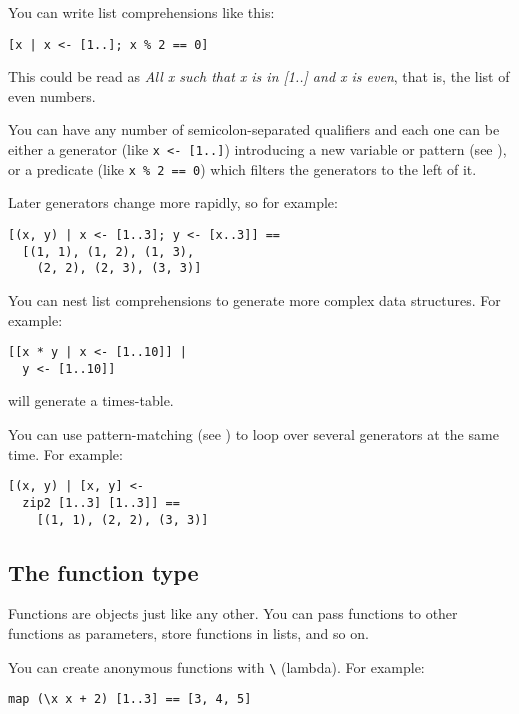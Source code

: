 You can write list comprehensions like this:

\begin{verbatim}
[x | x <- [1..]; x % 2 == 0]
\end{verbatim}

\noindent
This could be read as \emph{All x such that x is in [1..] and x is
even}, that is, the list of even numbers.

You can have any number of semicolon-separated qualifiers and each one can be
either a generator (like \verb"x <- [1..]") introducing a new variable or
pattern (see ),
or a predicate (like \verb"x % 2 == 0") which filters the generators to the
left of it. 

Later generators change more rapidly, so for example:

\begin{verbatim}
[(x, y) | x <- [1..3]; y <- [x..3]] ==
  [(1, 1), (1, 2), (1, 3), 
    (2, 2), (2, 3), (3, 3)]
\end{verbatim}

You can nest list comprehensions to generate more complex data structures. For
example:

\begin{verbatim}
[[x * y | x <- [1..10]] | 
  y <- [1..10]]
\end{verbatim}

\noindent
will generate a times-table.

You can use pattern-matching (see ) to loop over several 
generators at the same time. For example:

\begin{verbatim}
[(x, y) | [x, y] <- 
  zip2 [1..3] [1..3]] == 
    [(1, 1), (2, 2), (3, 3)]
\end{verbatim}

\subsection{The function type}

Functions are objects just like any other. You can pass functions to other
functions as parameters, store functions in lists, and so on. 

You can create anonymous functions with \verb"\" (lambda). For example:

\begin{verbatim}
map (\x x + 2) [1..3] == [3, 4, 5]
\end{verbatim}

